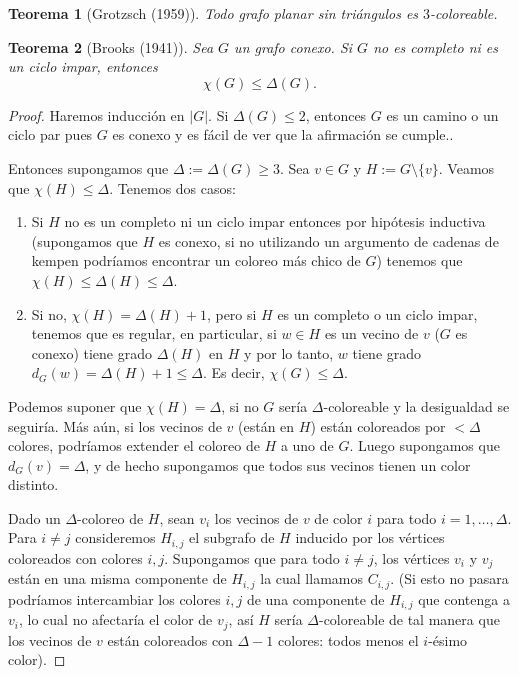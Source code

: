 \documentclass[12pt]{report}
\theoremstyle{plain}
\newtheorem{theorem}{Teorema}[section]
\theoremstyle{definition}
\newcommand{\abs}[1]{\left \vert #1 \right \vert}
\begin{document}
\begin{theorem}[Grotzsch (1959)]
Todo grafo planar sin triángulos es $3$-coloreable.
\end{theorem}






\begin{theorem}[Brooks (1941)]\label{th:brooks - un grafo conexo no completo ni ciclo impar luego chi(G) <= Delta(G)}
Sea $G$ un grafo conexo. Si $G$ no es completo ni es un ciclo impar, entonces
\[
    \chi (G) \leq \Delta (G).
\]
\end{theorem}
\begin{proof}
Haremos inducción en $\abs G$. Si $\Delta (G) \leq 2$, entonces $G$ es un camino o un ciclo par pues $G$ es conexo y es fácil de ver que la afirmación se cumple..

Entonces supongamos que $\Delta := \Delta (G) \geq 3$. Sea $v \in G$ y $H := G \setminus \{v\}$. Veamos que $\chi (H) \leq \Delta$. Tenemos dos casos:
\begin{enumerate}
\item Si $H$ no es un completo ni un ciclo impar entonces por hipótesis inductiva (supongamos que $H$ es conexo, si no utilizando un argumento de cadenas de kempen podríamos encontrar un coloreo más chico de $G$) tenemos que $\chi (H) \leq \Delta (H) \leq \Delta$.
\item Si no, $\chi (H) = \Delta (H) + 1$, pero si $H$ es un completo o un ciclo impar, tenemos que es regular, en particular, si $w \in H$ es un vecino de $v$ ($G$ es conexo) tiene grado $\Delta (H)$ en $H$ y por lo tanto, $w$ tiene grado $d_G (w) = \Delta (H) + 1 \leq \Delta$. Es decir, $\chi (G) \leq \Delta$.
\end{enumerate}
Podemos suponer que $\chi (H) = \Delta$, si no $G$ sería $\Delta$-coloreable y la desigualdad se seguiría. Más aún, si los vecinos de $v$ (están en $H$) están coloreados por $< \Delta$ colores, podríamos extender el coloreo de $H$ a uno de $G$. Luego supongamos que $d_G (v) = \Delta$, y de hecho supongamos que todos sus vecinos tienen un color distinto.

Dado un $\Delta$-coloreo de $H$, sean $v_i$ los vecinos de $v$ de color $i$ para todo $i = 1 , \ldots, \Delta$. Para $i \neq j$ consideremos $H_{i,j}$ el subgrafo de $H$ inducido por los vértices coloreados con colores $i,j$. Supongamos que para todo $i \neq j$, los vértices $v_i$ y $v_j$ están en una misma componente de $H_{i,j}$ la cual llamamos $C_{i,j}$. (Si esto no pasara podríamos intercambiar los colores $i,j$ de una componente de $H_{i,j}$ que contenga a $v_i$, lo cual no afectaría el color de $v_j$, así $H$ sería $\Delta$-coloreable de tal manera que los vecinos de $v$ están coloreados con $\Delta -1$ colores: todos menos el $i$-ésimo color).


\end{proof}
\end{document}
